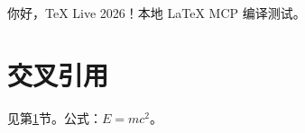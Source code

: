 \documentclass[fontset=fandol]{ctexart}
\begin{document}
你好，TeX Live 2026！本地 LaTeX MCP 编译测试。
\section{交叉引用}\label{sec:test}
见第\ref{sec:test}节。公式：$E=mc^2$。
\end{document}
